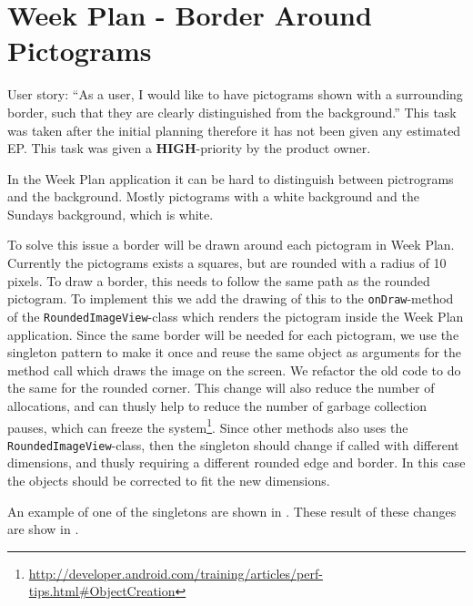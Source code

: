 \section{Week Plan - Border Around Pictograms}
User story: ``As a user, I would like to have pictograms shown with a surrounding border, such that they are clearly distinguished from the background.''
This task was taken after the initial planning therefore it has not been given any estimated EP. 
This task was given a \textbf{HIGH}-priority by the product owner. 

In the Week Plan application it can be hard to distinguish between pictrograms and the background.
Mostly pictograms with a white background and the Sundays background, which is white.

To solve this issue a border will be drawn around each pictogram in Week Plan. 
Currently the pictograms exists a squares, but are rounded with a radius of 10 pixels. 
To draw a border, this needs to follow the same path as the rounded pictogram. 
To implement this we add the drawing of this to the \texttt{onDraw}-method of the \texttt{RoundedImageView}-class which renders the pictogram inside the Week Plan application. 
Since the same border will be needed for each pictogram, we use the singleton pattern to make it once and reuse the same object as arguments for the method call which draws the image on the screen. 
We refactor the old code to do the same for the rounded corner. 
This change will also reduce the number of allocations, and can thusly help to reduce the number of garbage collection pauses, which can freeze the system\footnote{\url{http://developer.android.com/training/articles/perf-tips.html\#ObjectCreation}}. 
Since other methods also uses the \texttt{RoundedImageView}-class, then the singleton should change if called with different dimensions, and thusly requiring a different rounded edge and border. 
In this case the objects should be corrected to fit the new dimensions. 

An example of one of the singletons are shown in .
These result of these changes are show in . 

